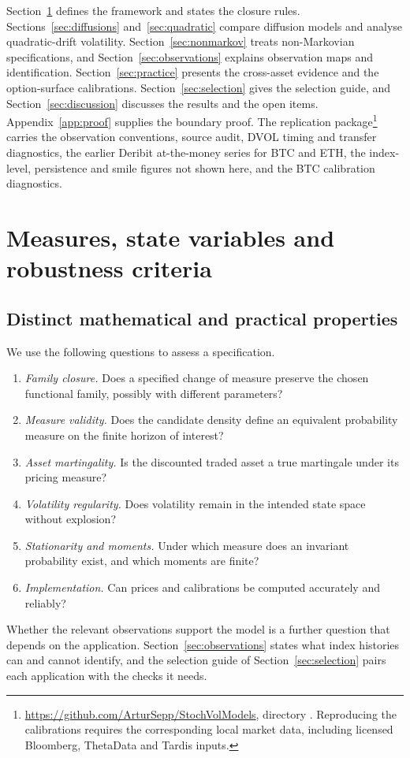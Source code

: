 \documentclass[11pt,a4paper]{article}
\theoremstyle{definition}
\theoremstyle{remark}
\begin{document}
Section~\ref{sec:framework} defines the framework and states the closure rules. Sections~\ref{sec:diffusions} and~\ref{sec:quadratic} compare diffusion models and analyse quadratic-drift volatility. Section~\ref{sec:nonmarkov} treats non-Markovian specifications, and Section~\ref{sec:observations} explains observation maps and identification. Section~\ref{sec:practice} presents the cross-asset evidence and the option-surface calibrations. Section~\ref{sec:selection} gives the selection guide, and Section~\ref{sec:discussion} discusses the results and the open items. Appendix~\ref{app:proof} supplies the boundary proof. The replication package\footnote{\url{https://github.com/ArturSepp/StochVolModels}, directory . Reproducing the calibrations requires the corresponding local market data, including licensed Bloomberg, ThetaData and Tardis inputs.} carries the observation conventions, source audit, DVOL timing and transfer diagnostics, the earlier Deribit at-the-money series for BTC and ETH, the index-level, persistence and smile figures not shown here, and the BTC calibration diagnostics.

\section{Measures, state variables and robustness criteria}
\label{sec:framework}

\subsection{Distinct mathematical and practical properties}

We use the following questions to assess a specification.
\begin{enumerate}
\item \emph{Family closure.} Does a specified change of measure preserve the chosen functional family, possibly with different parameters?
\item \emph{Measure validity.} Does the candidate density define an equivalent probability measure on the finite horizon of interest?
\item \emph{Asset martingality.} Is the discounted traded asset a true martingale under its pricing measure?
\item \emph{Volatility regularity.} Does volatility remain in the intended state space without explosion?
\item \emph{Stationarity and moments.} Under which measure does an invariant probability exist, and which moments are finite?
\item \emph{Implementation.} Can prices and calibrations be computed accurately and reliably?
\end{enumerate}
Whether the relevant observations support the model is a further question that depends on the application. Section~\ref{sec:observations} states what index histories can and cannot identify, and the selection guide of Section~\ref{sec:selection} pairs each application with the checks it needs.
\end{document}

